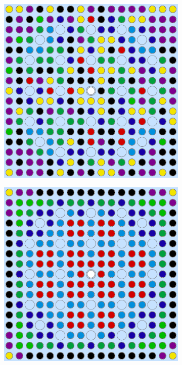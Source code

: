 \begin{appendices}
\begin{figure}[h!]
\begin{subfigure}{0.48\textwidth}
  \caption{}
  \label{fig:no-features-assm-16-combined-4}
\end{subfigure}
\begin{subfigure}{0.48\textwidth}
  \centering
  \includegraphics[width=0.85\linewidth]{figures/unsupervised/geometries/without-features/8-clusters/pinch/assm-16}
  \caption{}
  \label{fig:no-features-assm-16-pinch-8}
\end{subfigure}%
\begin{subfigure}{0.48\textwidth}
  \centering
  \includegraphics[width=0.85\linewidth]{figures/unsupervised/geometries/without-features/8-clusters/combined/assm-16}

\end{subfigure}
\end{figure}
\end{appendices}
